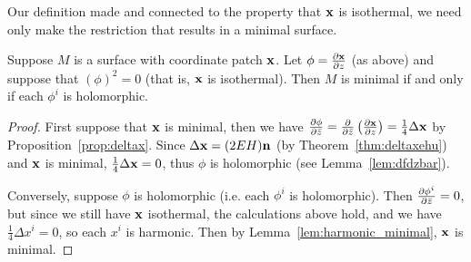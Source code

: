   Our definition made and connected to the property that $\mathbf{x}$ is isothermal, we need only make the restriction that results in a minimal surface.

  \begin{thm}
    Suppose $M$ is a surface with coordinate patch $\mathbf{x}$. Let $\phi = \frac{\partial\mathbf{x}}{\partial z}$ (as above) and suppose that $(\phi)^2 = 0$ (that is, $\mathbf{x}$ is isothermal). Then $M$ is minimal if and only if each $\phi^i$ is holomorphic.
  \end{thm}
  \begin{proof}
    First suppose that $\mathbf{x}$ is minimal, then we have $\frac{\partial\phi}{\partial\bar{z}} = \frac{\partial}{\partial\bar{z}}\left(\frac{\partial\mathbf{x}}{\partial z}\right) = \frac{1}{4}\Delta\mathbf{x}$ by Proposition~\ref{prop:deltax}. Since $\Delta\mathbf{x} = (2EH)\mathbf{n}$ (by Theorem~\ref{thm:deltaxehu}) and $\mathbf{x}$ is minimal, $\frac{1}{4}\Delta\mathbf{x} = 0$, thus $\phi$ is holomorphic (see Lemma~\ref{lem:dfdzbar}).

    Conversely, suppose $\phi$ is holomorphic (i.e. each $\phi^i$ is holomorphic). Then $\frac{\partial\phi^i}{\partial\bar{z}} = 0$, but since we still have $\mathbf{x}$ isothermal, the calculations above hold, and we have $\frac{1}{4}\Delta x^i = 0$, so each $x^i$ is harmonic. Then by Lemma~\ref{lem:harmonic_minimal}, $\mathbf{x}$ is minimal. 
  \end{proof}


